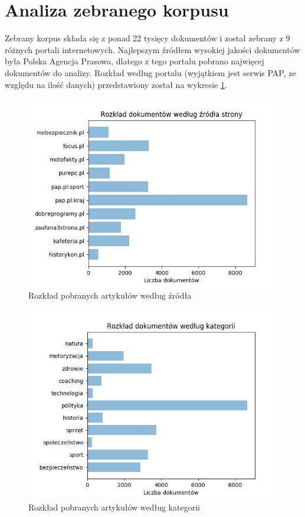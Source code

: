 \section{Analiza zebranego korpusu}
Zebrany korpus składa się z ponad 22 tysięcy dokumentów i został zebrany z 9 różnych portali internetowych. Najlepszym źródłem wysokiej jakości dokumentów była Polska Agencja Prasowa, dlatego z tego portalu pobrano najwięcej dokumentów do analizy. Rozkład według portalu (wyjątkiem jest serwis PAP, ze względu na ilość danych) przedstawiony został na wykresie \ref{fig:rozklad-wg-zrodla}. 
\begin{figure}[hb!]
	\centering
	\includegraphics[width=0.8\linewidth]{img/articles-summary-by-source}
	\caption{Rozkład pobranych artykułów według źródła}
	\label{fig:rozklad-wg-zrodla}
\end{figure}
\begin{figure}[ht!]
	\centering
	\includegraphics[width=0.8\linewidth]{img/articles-summary-by-category}
	\caption{Rozkład pobranych artykułów według kategorii}
	\label{fig:rozklad-wg-kategorii}
\end{figure}

